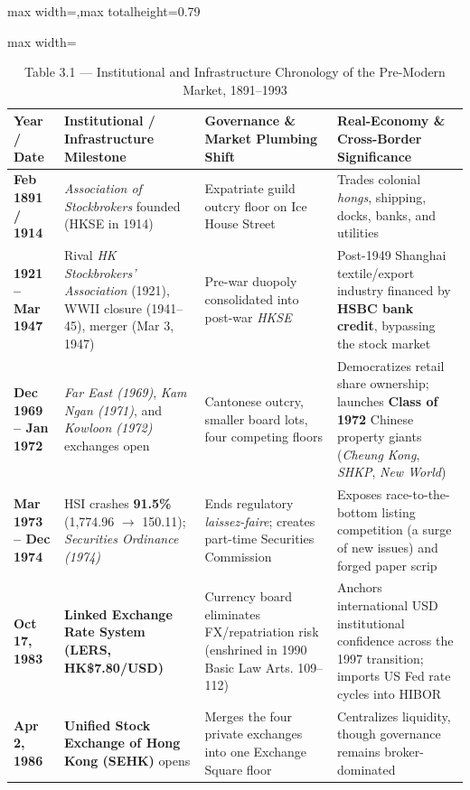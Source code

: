 \documentclass[11pt,letterpaper]{article}
\begin{document}
\begin{table}[!htbp]
\centering
\caption*{Table 3.1 — Institutional and Infrastructure Chronology of the Pre-Modern Market, 1891–1993}
\begin{adjustbox}{max width=\textwidth,max totalheight=0.79\textheight}
\begin{minipage}{\textwidth}\centering
\footnotesize
\setlength{\tabcolsep}{3.5pt}
\renewcommand{\arraystretch}{1.18}
\begin{adjustbox}{max width=\textwidth}
\begin{tabular}{l>{\raggedright\arraybackslash}p{4.83cm}>{\raggedright\arraybackslash}p{4.83cm}>{\raggedright\arraybackslash}p{4.83cm}}
\toprule
Year / Date & Institutional / Infrastructure Milestone & Governance \& Market Plumbing Shift & Real-Economy \& Cross-Border Significance \\
\midrule
\textbf{Feb 1891 / 1914} & \textit{Association of Stockbrokers} founded (HKSE in 1914) & Expatriate guild outcry floor on Ice House Street & Trades colonial \textit{hongs}, shipping, docks, banks, and utilities \\
\textbf{1921 – Mar 1947} & Rival \textit{HK Stockbrokers’ Association} (1921), WWII closure (1941–45), merger (Mar 3, 1947) & Pre-war duopoly consolidated into post-war \textit{HKSE} & Post-1949 Shanghai textile/export industry financed by \textbf{HSBC bank credit}, bypassing the stock market \\
\textbf{Dec 1969 – Jan 1972} & \textit{Far East (1969)}, \textit{Kam Ngan (1971)}, and \textit{Kowloon (1972)} exchanges open & Cantonese outcry, smaller board lots, four competing floors & Democratizes retail share ownership; launches \textbf{Class of 1972} Chinese property giants (\textit{Cheung Kong}, \textit{SHKP}, \textit{New World}) \\
\textbf{Mar 1973 – Dec 1974} & HSI crashes \textbf{91.5\%} (1,774.96 $\to$ 150.11); \textit{Securities Ordinance (1974)} & Ends regulatory \textit{laissez-faire}; creates part-time Securities Commission & Exposes race-to-the-bottom listing competition (a surge of new issues) and forged paper scrip \\
\textbf{Oct 17, 1983} & \textbf{Linked Exchange Rate System (LERS, HK\$7.80/USD)} & Currency board eliminates FX/repatriation risk (enshrined in 1990 Basic Law Arts. 109–112) & Anchors international USD institutional confidence across the 1997 transition; imports US Fed rate cycles into HIBOR \\
\textbf{Apr 2, 1986} & \textbf{Unified Stock Exchange of Hong Kong (SEHK)} opens & Merges the four private exchanges into one Exchange Square floor & Centralizes liquidity, though governance remains broker-dominated \\

\end{tabular}
\end{adjustbox}
\end{minipage}
\end{adjustbox}
\end{table}
\end{document}
